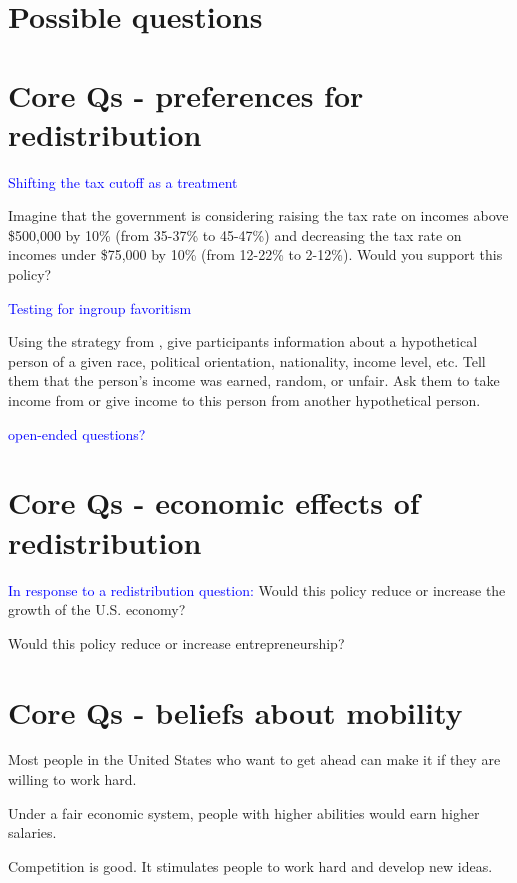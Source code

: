 \documentclass[12pt]{article}
\newcommand{\blue}[1]{\textcolor{blue}{#1}}
\begin{document}
\section*{Possible questions}

\tableofcontents

\section{Core Qs - preferences for redistribution}

    \blue{Shifting the tax cutoff as a treatment}
    
    Imagine that the government is considering raising the tax rate on incomes above \$500,000 by 10\% (from 35-37\% to 45-47\%) and decreasing the tax rate on incomes under \$75,000 by 10\% (from 12-22\% to 2-12\%). Would you support this policy?

    \blue{Testing for ingroup favoritism}
    
    Using the strategy from \cite{fischbacher2023identity}, give participants information about a hypothetical person of a given race, political orientation, nationality, income level, etc. Tell them that the person's income was earned, random, or unfair. Ask them to take income from or give income to this person from another hypothetical person.

    \blue{open-ended questions?}

\section{Core Qs - economic effects of redistribution}

    \blue{In response to a redistribution question:}
    Would this policy reduce or increase the growth of the U.S. economy?

    Would this policy reduce or increase entrepreneurship?

\section{Core Qs - beliefs about mobility}

    Most people in the United States who want to get ahead can make it if they are willing to work hard.

    Under a fair economic system, people with higher abilities would earn higher salaries.

    Competition is good. It stimulates people to work hard and develop new ideas.
\end{document}

